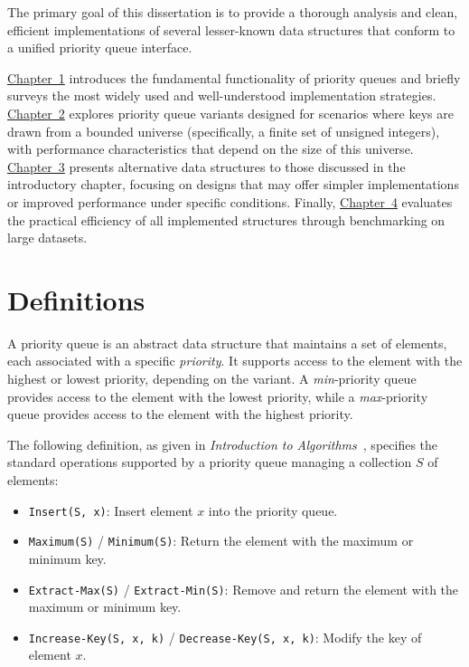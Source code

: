 The primary goal of this dissertation is to provide a thorough analysis and clean, efficient implementations of several lesser-known data structures that conform to a unified priority queue interface.

\hyperref[chap:intro]{Chapter~1} introduces the fundamental functionality of priority queues and briefly surveys the most widely used and well-understood implementation strategies. \hyperref[chap:integer]{Chapter~2} explores priority queue variants designed for scenarios where keys are drawn from a bounded universe (specifically, a finite set of unsigned integers), with performance characteristics that depend on the size of this universe. \hyperref[chap:general]{Chapter~3} presents alternative data structures to those discussed in the introductory chapter, focusing on designs that may offer simpler implementations or improved performance under specific conditions. Finally, \hyperref[chap:benchmark]{Chapter~4} evaluates the practical efficiency of all implemented structures through benchmarking on large datasets.

\section{Definitions}

A priority queue is an abstract data structure that maintains a set of elements, each associated with a specific \emph{priority}. It supports access to the element with the highest or lowest priority, depending on the variant. A \emph{min}-priority queue provides access to the element with the lowest priority, while a \emph{max}-priority queue provides access to the element with the highest priority.

The following definition, as given in \emph{Introduction to Algorithms}~\cite{CLRS2022}, specifies the standard operations supported by a priority queue managing a collection \( S \) of elements:

\begin{itemize}
    \item \texttt{Insert(S, x)}: Insert element \( x \) into the priority queue.
    \item \texttt{Maximum(S)} / \texttt{Minimum(S)}: Return the element with the maximum or minimum key.
    \item \texttt{Extract-Max(S)} / \texttt{Extract-Min(S)}: Remove and return the element with the maximum or minimum key.
    \item \texttt{Increase-Key(S, x, k)} / \texttt{Decrease-Key(S, x, k)}: Modify the key of element \( x \).
\end{itemize}


